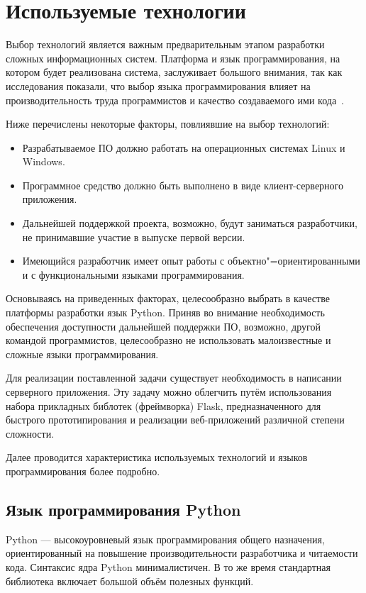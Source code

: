 \section{Используемые технологии}
\label{sec:techs:intro}

Выбор технологий является важным предварительным этапом разработки сложных информационных систем.
Платформа и язык программирования, на котором будет реализована система, заслуживает большого внимания, так как исследования показали, что выбор языка программирования влияет на производительность труда программистов и качество создаваемого ими кода~\cite[c.~59]{mcconnell_2005}.

Ниже перечислены некоторые факторы, повлиявшие на выбор технологий:
\begin{itemize}
\item Разрабатываемое ПО должно работать на операционных системах Linux и Windows.
\item Программное средство должно быть выполнено в виде клиент-серверного приложения.
\item Дальнейшей поддержкой проекта, возможно, будут заниматься разработчики, не принимавшие участие в выпуске первой версии.
\item Имеющийся разработчик имеет опыт работы с объектно"=ориентированными и с функциональными языками программирования.
\end{itemize}

Основываясь на приведенных факторах, целесообразно выбрать в качестве платформы разработки язык Python. Приняв во внимание необходимость обеспечения доступности дальнейшей поддержки ПО, возможно, другой командой программистов, целесообразно не использовать малоизвестные и сложные языки программирования.

Для реализации поставленной задачи существует необходимость в написании серверного приложения. Эту задачу можно облегчить путём использования набора прикладных библотек (фреймворка) Flask, предназначенного для быстрого прототипирования и реализации веб-приложений различной степени сложности.

Далее проводится характеристика используемых технологий и языков программирования более подробно.



\subsection{Язык программирования Python}
\label{sub:techs:python}
Python — высокоуровневый язык программирования общего назначения, ориентированный на повышение производительности разработчика и читаемости кода. Синтаксис ядра Python минималистичен. В то же время стандартная библиотека включает большой объём полезных функций.

